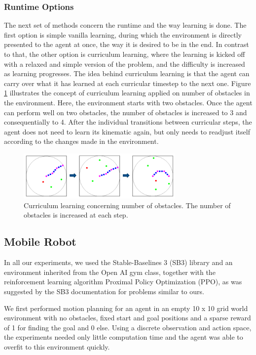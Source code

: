 \documentclass[conference]{IEEEtran}
\begin{document}
\subsubsection{Runtime Options}

The next set of methods concern the runtime and the way learning is done. The first option is simple vanilla learning, during which the environment is directly presented to the agent at once, the way it is desired to be in the end. In contrast to that, the other option is curriculum learning, where the learning is kicked off with a relaxed and simple version of the problem, and the difficulty is increased as learning progresses. The idea behind curriculum learning is that the agent can carry over what it has learned at each curricular timestep to the next one. Figure \ref{fig2} illustrates the concept of curriculum learning applied on number of obstacles in the environment. Here, the environment starts with two obstacles. Once the agent can perform well on two obstacles, the number of obstacles is increased to 3 and consequentially to 4. After the individual transitions between curricular steps, the agent does not need to learn its kinematic again, but only needs to readjust itself according to the changes made in the environment.

\begin{figure}[!t]
	\centering
	\includegraphics[width=3.2in]{currlearning}
	\caption{Curriculum learning concerning number of obstacles. The number of obstacles is increased at each step.}
	\label{fig2}
\end{figure}

\subsection{Mobile Robot}

In all our experiments, we used the Stable-Baselines 3 (SB3) library and an environment inherited from the Open AI gym class, together with the reinforcement learning algorithm Proximal Policy Optimization (PPO), as was suggested by the SB3 documentation for problems similar to ours. 

We first performed motion planning for an agent in an empty 10 x 10 grid world environment with no obstacles, fixed start and goal positions and a sparse reward of 1 for finding the goal and 0 else. Using a discrete observation and action space, the experiments needed only little computation time and the agent was able to overfit to this environment quickly.
\end{document}
